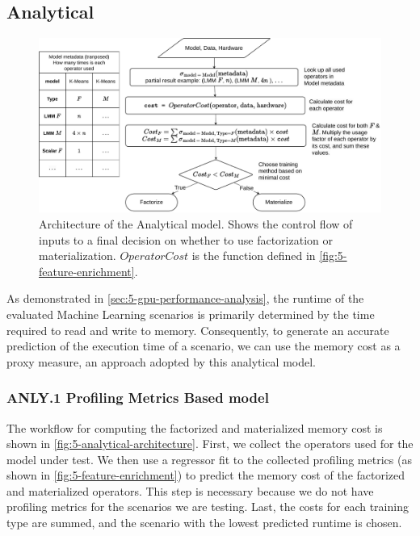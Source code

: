 \subsection{Analytical}
\label{subsec:5-analytical}
\begin{figure}[ht]
    \centering
    \includegraphics[width=\linewidth]{chapters/05_cost_estimation/figures/analytical-architecture.pdf}
    \caption[Analytical model Architecture]{Architecture of the Analytical model. Shows the control flow of inputs to a final decision on whether to use factorization or materialization. $OperatorCost$ is the function defined in \autoref{fig:5-feature-enrichment}.}
    \label{fig:5-analytical-architecture}
\end{figure}

As demonstrated in \autoref{sec:5-gpu-performance-analysis}, the runtime of the evaluated Machine Learning scenarios is primarily determined by the time required to read and write to memory. Consequently, to generate an accurate prediction of the execution time of a scenario, we can use the memory cost as a proxy measure, an approach adopted by this analytical model.

\subsubsection*{ANLY.1 Profiling Metrics Based model}
The workflow for computing the factorized and materialized memory cost is shown in \autoref{fig:5-analytical-architecture}. First, we collect the operators used for the model under test. We then use a regressor fit to the collected profiling metrics (as shown in \autoref{fig:5-feature-enrichment}) to predict the memory cost of the factorized and materialized operators. This step is necessary because we do not have profiling metrics for the scenarios we are testing. Last, the costs for each training type are summed, and the scenario with the lowest predicted runtime is chosen.


